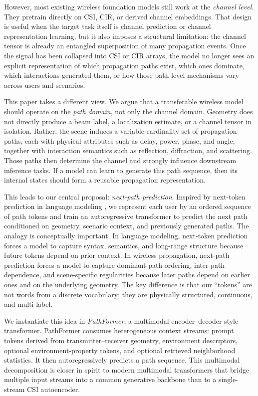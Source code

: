 \documentclass[11pt]{article}
\begin{document}
However, most existing wireless foundation models still work at the \emph{channel level}. They pretrain directly on CSI, CIR, or derived channel embeddings. That design is useful when the target task itself is channel prediction or channel representation learning, but it also imposes a structural limitation: the channel tensor is already an entangled superposition of many propagation events. Once the signal has been collapsed into CSI or CIR arrays, the model no longer sees an explicit representation of which propagation paths exist, which ones dominate, which interactions generated them, or how those path-level mechanisms vary across users and scenarios.

This paper takes a different view. We argue that a transferable wireless model should operate on the \emph{path domain}, not only the channel domain. Geometry does not directly produce a beam label, a localization estimate, or a channel tensor in isolation. Rather, the scene induces a variable-cardinality set of propagation paths, each with physical attributes such as delay, power, phase, and angle, together with interaction semantics such as reflection, diffraction, and scattering. Those paths then determine the channel and strongly influence downstream inference tasks. If a model can learn to generate this path sequence, then its internal states should form a reusable propagation representation.

This leads to our central proposal: \emph{next-path prediction}. Inspired by next-token prediction in language modeling \cite{vaswani,gpt3}, we represent each user by an ordered sequence of path tokens and train an autoregressive transformer to predict the next path conditioned on geometry, scenario context, and previously generated paths. The analogy is conceptually important. In language modeling, next-token prediction forces a model to capture syntax, semantics, and long-range structure because future tokens depend on prior context. In wireless propagation, next-path prediction forces a model to capture dominant-path ordering, inter-path dependence, and scene-specific regularities because later paths depend on earlier ones and on the underlying geometry. The key difference is that our ``tokens'' are not words from a discrete vocabulary; they are physically structured, continuous, and multi-label.

We instantiate this idea in \emph{PathFormer}, a multimodal encoder--decoder style transformer. PathFormer consumes heterogeneous context streams: prompt tokens derived from transmitter--receiver geometry, environment descriptors, optional environment-property tokens, and optional retrieved neighborhood statistics. It then autoregressively predicts a path sequence. This multimodal decomposition is closer in spirit to modern multimodal transformers that bridge multiple input streams into a common generative backbone \cite{flamingo,blip2,palme} than to a single-stream CSI autoencoder.
\end{document}
